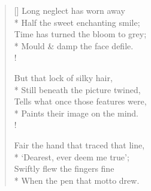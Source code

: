 \documentclass[MAIN]{subfiles}
\begin{document}
\settowidth{\versewidth}{Time has turned the bloom to grey;}
\begin{verse}[\versewidth]
Long neglect has worn away\\*
\vin Half the sweet enchanting smile;\\
Time has turned the bloom to grey;\\*
\vin Mould \& damp the face defile.\\!

But that lock of silky hair,\\*
\vin Still beneath the picture twined,\\
Tells what once those features were,\\*
\vin Paints their image on the mind.\\!

Fair the hand that traced that line,\\*
\vin `Dearest, ever deem me true';\\
Swiftly flew the fingers fine\\*
\vin When the pen that motto drew.
\end{verse}
\end{document}

